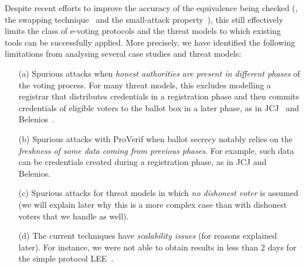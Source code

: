 Despite recent efforts to improve the accuracy of the equivalence being checked
(\eg, the swapping technique~\cite{vote-CSF16,dreier2017beyond} and the small-attack property~\cite{vote-ESO16}),
this still effectively limits the class of e-voting protocols and the threat models
to which existing tools can be successfully applied.
More precisely, 
we have identified the following limitations from analysing several case
studies and threat models:
\begin{itemize}
\item[(a)] Spurious attacks when {\em honest authorities are present in
	different phases} of the voting process.
For many threat models, this excludes modelling a registrar that distributes credentials
in a registration phase and then commits credentials of eligible voters
to the ballot box in a later phase, as in JCJ~\cite{juels2005coercion}
and Belenios~\cite{cortier2014election}.

\item[(b)] Spurious attacks with ProVerif when ballot secrecy notably relies on the {\em freshness of some data coming from previous phases}.
    For example, such data can be credentials created during a registration
    phase, as in JCJ and Belenios.

  \item[(c)]
    Spurious attacks for threat models in which {\em no dishonest voter} is assumed
    (we will explain later why this is a more complex case than
    with dishonest voters that we handle as well).
%

\item[(d)] The current techniques have {\em scalability issues} (for reasons explained later).
For instance, we were not able to obtain results in less than 2 days for the simple protocol LEE~\cite{DKR-jcs09}.
\end{itemize}

